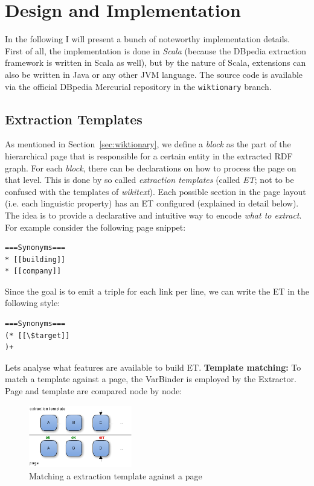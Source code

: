 \section{Design and Implementation}
\label{sec:implementation}
In the following I will present a bunch of noteworthy implementation details. First of all, the implementation is done in \textit{Scala} (because the DBpedia extraction framework is written in Scala as well), but by the nature of Scala, extensions can also be written in Java or any other JVM language. 
The source code is available via the official DBpedia Mercurial repository in the \texttt{wiktionary} branch.

\subsection{Extraction Templates}\label{sec:extpl}
As mentioned in Section~\ref{sec:wiktionary}, we define a \textit{block} as the part of the hierarchical page that is responsible for a certain entity in the extracted RDF graph. 
For each \textit{block}, there can be declarations on how to process the page on that level.
This is done by so called \textit{extraction templates} (called \textit{ET}; not to be confused with the templates of \textit{wikitext}).
Each possible section in the \wik page layout (i.e. each linguistic property) has an ET configured (explained in detail below). 
The idea is to provide a declarative and intuitive way to encode \textit{what to extract}.
For example consider the following page snippet:
\begin{lstlisting}
===Synonyms===
* [[building]]
* [[company]]
\end{lstlisting}
Since the goal is to emit a triple for each link per line, we can write the ET in the following style:
\begin{lstlisting}
===Synonyms===
(* [[\$target]]
)+
\end{lstlisting}
Lets analyse what features are available to build ET.\newline
\textbf{Template matching:}
To match a template against a page, the VarBinder is employed by the Extractor. Page and template are compared node by node:
\begin{figure}[h]
\centering
\includegraphics[width=0.4\textwidth]{../images/matching}
\caption{Matching a extraction template against a page}
\label{fig:matching}
\end{figure}
